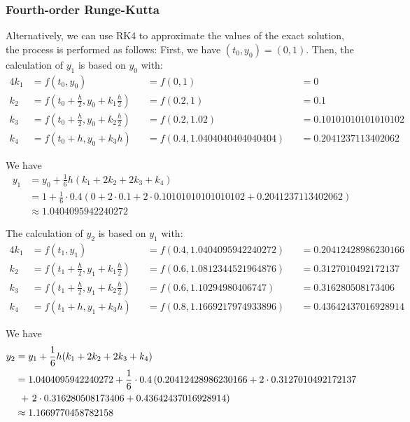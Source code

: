 \documentclass[a4paper]{article}
\numberwithin{equation}{section}
\begin{document}
\subsubsection{Fourth-order Runge-Kutta}
Alternatively, we can use RK4 to approximate the values of the exact solution, the process is performed as follows:
First, we have \( (t_0, y_0) = (0, 1) \). Then, the calculation of \( y_1 \) is based on \( y_0 \) with:
\begin{alignat*}{4}
  k_1 & = f(t_0, y_0)                                            &  & = f(0, 1)                    &  & = 0                   \\
  k_2 & = f \left(t_0 + \frac{h}{2}, y_0 + k_1\frac{h}{2}\right) &  & = f(0.2, 1)                  &  & = 0.1                 \\
  k_3 & = f \left(t_0 + \frac{h}{2}, y_0 + k_2\frac{h}{2}\right) &  & = f(0.2, 1.02)               &  & = 0.10101010101010102 \\
  k_4 & = f(t_0 + h, y_0 + k_3h)                                 &  & = f(0.4, 1.0404040404040404) &  & = 0.2041237113402062
\end{alignat*}

We have
\begin{align*}
  y_1 & = y_0 + \frac{1}{6}h(k_1 + 2k_2 + 2k_3 + k_4)                                                              \\
      & = 1 + \frac{1}{6} \cdot 0.4\left(0 + 2 \cdot 0.1 + 2 \cdot 0.10101010101010102 + 0.2041237113402062\right) \\
      & \approx 1.0404095942240272
\end{align*}

The calculation of \( y_2 \) is based on \( y_1 \) with:
\begin{alignat*}{4}
  k_1 & = f(t_1, y_1)                                            &  & = f(0.4, 1.0404095942240272) &  & = 0.20412428986230166 \\
  k_2 & = f \left(t_1 + \frac{h}{2}, y_1 + k_1\frac{h}{2}\right) &  & = f(0.6, 1.0812344521964876) &  & = 0.3127010492172137  \\
  k_3 & = f \left(t_1 + \frac{h}{2}, y_1 + k_2\frac{h}{2}\right) &  & = f(0.6, 1.10294980406747)   &  & = 0.316280508173406   \\
  k_4 & = f(t_1 + h, y_1 + k_3h)                                 &  & = f(0.8, 1.1669217974933896) &  & = 0.43642437016928914
\end{alignat*}

We have
\begin{align*}
  y_2 & = y_1 + \frac{1}{6}h(k_1 + 2k_2 + 2k_3 + k_4)                                                             \\
      & = 1.0404095942240272 + \frac{1}{6} \cdot 0.4\left(0.20412428986230166 + 2 \cdot 0.3127010492172137\right. \\
      & \ \left.+\ 2 \cdot 0.316280508173406 + 0.43642437016928914\vphantom{1}\right)                             \\
      & \approx 1.1669770458782158
\end{align*}
\end{document}
